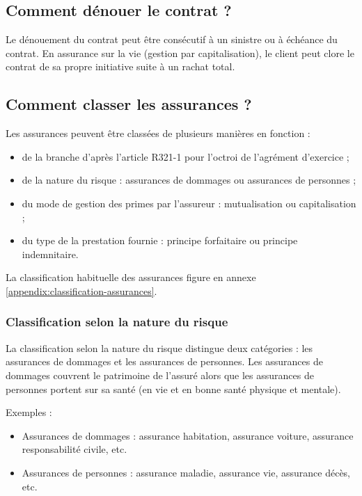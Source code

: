 \documentclass{article}
\begin{document}
\subsection{Comment dénouer le contrat ?}
Le dénouement du contrat peut être consécutif à un sinistre ou à échéance du contrat. En assurance sur la vie (gestion par capitalisation), le client peut clore le contrat de sa propre initiative suite à un rachat total.  


\subsection{Comment classer les assurances ?}
Les assurances peuvent être classées de plusieurs manières en fonction :
\begin{itemize}
    \item de la branche d'après l'article R321-1 pour l'octroi de l'agrément d'exercice ;
    \item de la nature du risque : assurances de dommages ou assurances de personnes ;
    \item du mode de gestion des primes par l'assureur : mutualisation ou capitalisation ;
    \item du type de la prestation fournie : principe forfaitaire ou principe indemnitaire.
\end{itemize}

La classification habituelle des assurances figure en annexe \ref{appendix:classification-assurances}.

\subsubsection{Classification selon la nature du risque}
La classification selon la nature du risque distingue deux catégories : les assurances de dommages et les assurances de personnes. Les assurances de dommages couvrent le patrimoine de l'assuré alors que les assurances de personnes portent sur sa santé (en vie et en bonne santé physique et mentale).

Exemples :
\begin{itemize}
    \item Assurances de dommages : assurance habitation, assurance voiture, assurance responsabilité civile, etc.
    \item Assurances de personnes : assurance maladie, assurance vie, assurance décès, etc.
\end{itemize}
\end{document}
